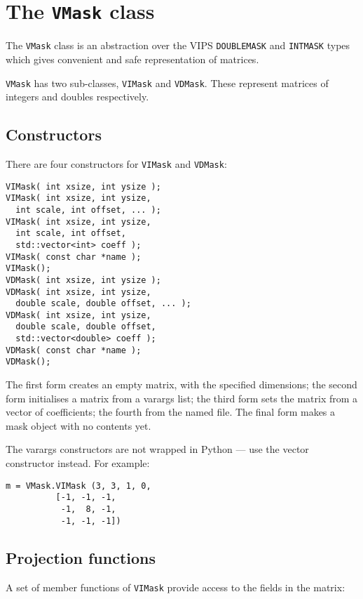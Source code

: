 \section{The \texttt{VMask} class}

The \verb+VMask+ class is an abstraction over the VIPS \verb+DOUBLEMASK+ and
\verb+INTMASK+ types which gives convenient and safe representation of
matrices.

\verb+VMask+ has two sub-classes, \verb+VIMask+ and \verb+VDMask+. These
represent matrices of integers and doubles respectively.

\subsection{Constructors}

There are four constructors for \verb+VIMask+ and \verb+VDMask+:

\begin{verbatim}
VIMask( int xsize, int ysize );
VIMask( int xsize, int ysize, 
  int scale, int offset, ... );
VIMask( int xsize, int ysize, 
  int scale, int offset, 
  std::vector<int> coeff );
VIMask( const char *name );
VIMask();
VDMask( int xsize, int ysize );
VDMask( int xsize, int ysize, 
  double scale, double offset, ... );
VDMask( int xsize, int ysize, 
  double scale, double offset, 
  std::vector<double> coeff );
VDMask( const char *name );
VDMask();
\end{verbatim}

The first form creates an empty matrix, with the specified dimensions;
the second form initialises a matrix from a varargs list; the third form
sets the matrix from a vector of coefficients; the fourth from the named file. 
The final form makes a mask object with no contents yet.

The varargs constructors are not wrapped in Python --- use the vector
constructor instead. For example:

\begin{verbatim}
m = VMask.VIMask (3, 3, 1, 0, 
		  [-1, -1, -1,
		   -1,  8, -1,
		   -1, -1, -1])
\end{verbatim}

\subsection{Projection functions}

A set of member functions of \verb+VIMask+ provide access to the fields in
the matrix:

